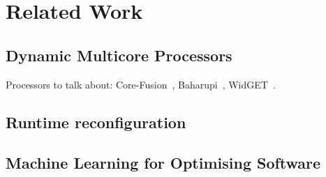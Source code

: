 \chapter{Related Work}

\section{Dynamic Multicore Processors}

Processors to talk about: Core-Fusion~\cite{ipek2007CoreFusion}, Baharupi~\cite{pricopi2012bahurupi}, WidGET~\cite{Watanabe2010Widget}.

\section{Runtime reconfiguration}
\section{Machine Learning for Optimising Software}